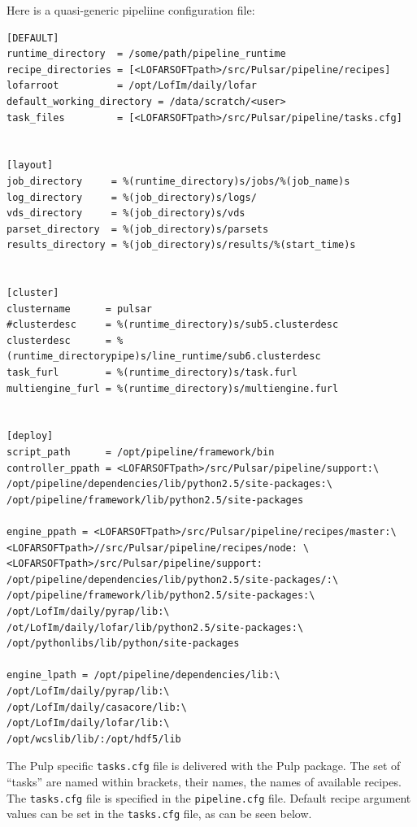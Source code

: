 \documentclass[a4paper,10pt,bibtotoc]{scrartcl}
\begin{document}
Here is a quasi-generic pipeliine configuration file:
\begin{verbatim}
[DEFAULT]
runtime_directory  = /some/path/pipeline_runtime
recipe_directories = [<LOFARSOFTpath>/src/Pulsar/pipeline/recipes]
lofarroot          = /opt/LofIm/daily/lofar
default_working_directory = /data/scratch/<user>
task_files         = [<LOFARSOFTpath>/src/Pulsar/pipeline/tasks.cfg]


[layout]
job_directory     = %(runtime_directory)s/jobs/%(job_name)s
log_directory     = %(job_directory)s/logs/
vds_directory     = %(job_directory)s/vds
parset_directory  = %(job_directory)s/parsets
results_directory = %(job_directory)s/results/%(start_time)s


[cluster]
clustername      = pulsar
#clusterdesc     = %(runtime_directory)s/sub5.clusterdesc
clusterdesc      = %(runtime_directorypipe)s/line_runtime/sub6.clusterdesc
task_furl        = %(runtime_directory)s/task.furl
multiengine_furl = %(runtime_directory)s/multiengine.furl


[deploy]
script_path      = /opt/pipeline/framework/bin
controller_ppath = <LOFARSOFTpath>/src/Pulsar/pipeline/support:\
/opt/pipeline/dependencies/lib/python2.5/site-packages:\
/opt/pipeline/framework/lib/python2.5/site-packages

engine_ppath = <LOFARSOFTpath>/src/Pulsar/pipeline/recipes/master:\
<LOFARSOFTpath>//src/Pulsar/pipeline/recipes/node: \
<LOFARSOFTpath>/src/Pulsar/pipeline/support:
/opt/pipeline/dependencies/lib/python2.5/site-packages/:\
/opt/pipeline/framework/lib/python2.5/site-packages:\
/opt/LofIm/daily/pyrap/lib:\
/ot/LofIm/daily/lofar/lib/python2.5/site-packages:\
/opt/pythonlibs/lib/python/site-packages

engine_lpath = /opt/pipeline/dependencies/lib:\
/opt/LofIm/daily/pyrap/lib:\
/opt/LofIm/daily/casacore/lib:\
/opt/LofIm/daily/lofar/lib:\
/opt/wcslib/lib/:/opt/hdf5/lib

\end{verbatim}

The Pulp specific \verb|tasks.cfg| file is delivered with the Pulp
package. The set of  ``tasks'' are named within brackets, their names,
the names of available recipes.  The \verb|tasks.cfg| file is
specified in the \verb|pipeline.cfg| file.  Default recipe argument values
can be set in the \verb|tasks.cfg| file, as can be seen below.
\end{document}
